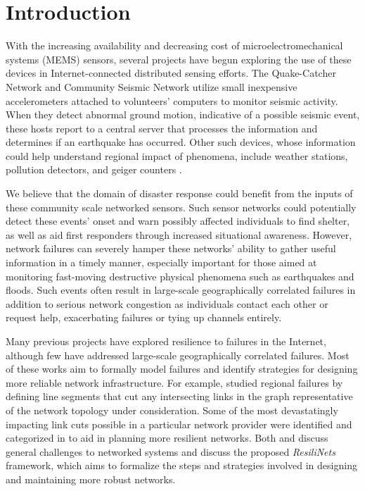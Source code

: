 \documentclass[conference]{IEEEtran}
\begin{document}
\section{Introduction}

With the increasing availability and decreasing cost of microelectromechanical systems (MEMS) sensors, several projects have begun exploring the use of these devices in Internet-connected distributed sensing efforts.
The Quake-Catcher Network \cite{qcn} and Community Seismic Network \cite{csn_site} utilize small inexpensive accelerometers attached to volunteers' computers to monitor seismic activity.
When they detect abnormal ground motion, indicative of a possible seismic event, these hosts report to a central server that processes the information and determines if an earthquake has occurred.
Other such devices, whose information could help understand regional impact of phenomena, include weather stations, pollution detectors, and geiger counters \cite{caltech_sensors}.

We believe that the domain of disaster response could benefit from the inputs of these community scale networked sensors.
Such sensor networks could potentially detect these events' onset and warn possibly affected individuals to find shelter, as well as aid first responders through increased situational awareness.
However, network failures can severely hamper these networks' ability to gather useful information in a timely manner, especially important for those aimed at monitoring fast-moving destructive physical phenomena such as earthquakes and floods.
Such events often result in large-scale geographically correlated failures in addition to serious network congestion as individuals contact each other or request help, exacerbating failures or tying up channels entirely.

Many previous projects have explored resilience to failures in the Internet, although few have addressed large-scale geographically correlated failures.
Most of these works aim to formally model failures and identify strategies for designing more reliable network infrastructure.
For example, \cite{geocorrelated} studied regional failures by defining line segments that cut any intersecting links in the graph representative of the network topology under consideration.
Some of the most devastatingly impacting link cuts possible in a particular network provider were identified and categorized in \cite{net_disaster_planning} to aid in planning more resilient networks.
Both \cite{model_analysis} and \cite{resilience_survey} discuss general challenges to networked systems and discuss the proposed \emph{ResiliNets} framework, which aims to formalize the steps and strategies involved in designing and maintaining more robust networks.
\end{document}
